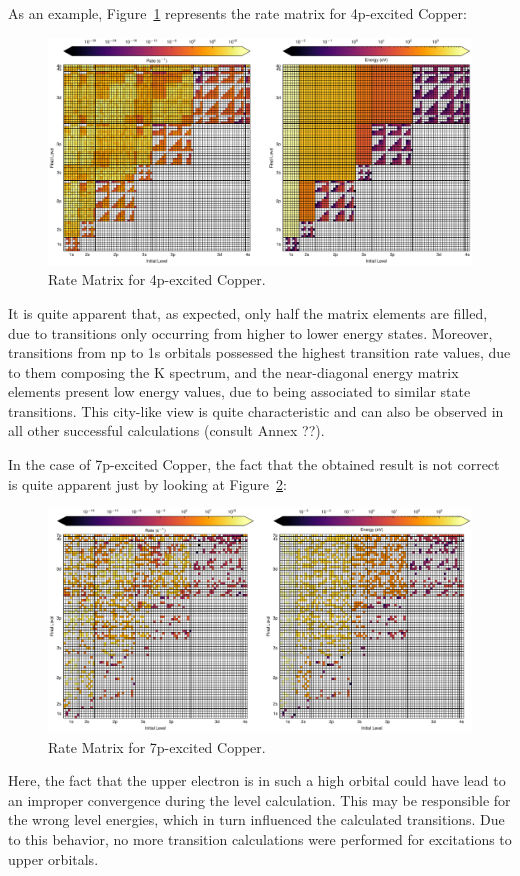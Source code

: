 As an example, Figure~\ref{fig:4p_rm} represents the rate matrix for 4p-excited Copper:

\begin{figure}[h!]
    \centering
    \includegraphics[width=\linewidth]{Chapters/Figures/Chapter2/4p_RM.pdf}
    \caption{Rate Matrix for 4p-excited Copper.}\label{fig:4p_rm}
\end{figure}

It is quite apparent that, as expected, only half the matrix elements are filled, due to transitions only occurring from higher to lower energy states. Moreover, transitions from np to 1s orbitals possessed the highest transition rate values, due to them composing the K spectrum, and the near-diagonal energy matrix elements present low energy values, due to being associated to similar state transitions. This city-like view is quite characteristic and can also be observed in all other successful calculations (consult Annex ??).

In the case of 7p-excited Copper, the fact that the obtained result is not correct is quite apparent just by looking at Figure~\ref{fig:7p_rm}:

\begin{figure}[h!]
    \centering
    \includegraphics[width=\linewidth]{Chapters/Figures/Chapter2/7p_RM.pdf}
    \caption{Rate Matrix for 7p-excited Copper.}\label{fig:7p_rm}
\end{figure}

Here, the fact that the upper electron is in such a high orbital could have lead to an improper convergence during the level calculation. This may be responsible for the wrong level energies, which in turn influenced the calculated transitions. Due to this behavior, no more transition calculations were performed for excitations to upper orbitals.
